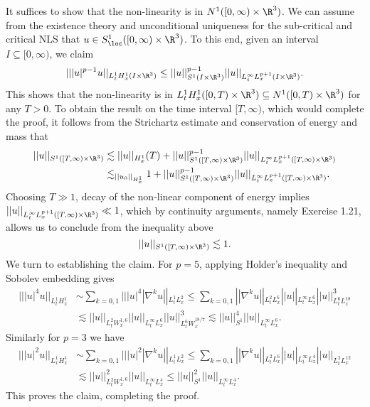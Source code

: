 \begin{solution}
	It suffices to show that the non-linearity is in $N^1 ([0, \infty) \times \R^3)$. We can assume from the existence theory and unconditional uniqueness for the sub-critical and critical NLS that $u \in S^1_{\loc} ([0, \infty) \times \R^3)$. To this end, given an interval $I \subseteq [0, \infty)$, we claim
		\[ || |u|^{p - 1} u||_{L^1_t H^1_x (I \times \R^3)} \leq ||u||_{S^1 (I \times \R^3)}^{p - 1} ||u||_{L^\infty_t L^{p + 1}_x (I \times \R^3)}. \]
	This shows that the non-linearity is in $L^1_t H^1_x ([0, T) \times \R^3) \subseteq N^1 ([0, T) \times \R^3)$ for any $T > 0$. To obtain the result on the time interval $[T, \infty)$, which would complete the proof, it follows from the Strichartz estimate and conservation of energy and mass that
		\begin{align*}
			 ||u||_{S^1 ([T, \infty) \times \R^3)} 
			 	&\lesssim ||u||_{H^1_x} (T) + ||u||_{S^1 ([T, \infty) \times \R^3)}^{p - 1} ||u||_{L^\infty_t L^{p + 1}_x ([T, \infty) \times \R^3)} \\
			 	&\lesssim_{||u_0||_{H^1_x}} 1 + ||u||_{S^1 ([T, \infty) \times \R^3)}^{p - 1} ||u||_{L^\infty_t L^{p + 1}_x ([T, \infty) \times \R^3)}.
	\end{align*}
	Choosing $T \gg 1$, decay of the non-linear component of energy implies $||u||_{L^\infty_t L^{p + 1}_x ([T, \infty) \times \R^3)} \ll 1$, which by continuity arguments, namely Exercise 1.21, allows us to conclude from the inequality above
		\[ ||u||_{S^1 ([T, \infty) \times \R^3)} \lesssim 1. \]
	We turn to establishing the claim. For $p = 5$, applying Holder's inequality and Sobolev embedding gives
		\begin{align*}
			|| |u|^4 u||_{L^1_t H^1_x} 
				&\sim \sum_{k = 0, 1} || |u|^4 |\nabla^k u||_{L^1_t L^2_x} \leq \sum_{k = 0, 1} || \nabla^k u||_{L^2_t L^6_x} ||u||_{L^\infty_t L^6_x} ||u||_{L^6_t L^{18}_x}^3 \\
				&\lesssim || u||_{L^2_t W^{1, 6}_x} ||u||_{L^\infty_t L^6_x} ||u||_{L^6_t \dot W^{18/7}_x}^3 \lesssim ||u||_{S^1}^4 ||u||_{L^\infty_t L^6_x}.
		\end{align*} 
	Similarly for $p = 3$ we have
		\begin{align*}
			|| |u|^2 u||_{L^1_x H^1_x} 
				&\sim \sum_{k = 0, 1} || |u|^2 |\nabla^k u||_{L^1_t L^2_x} \leq \sum_{k = 0, 1} || \nabla^k u||_{L^2_t L^6_x} ||u||_{L^\infty_t L^4_x} ||u||_{L^2_t L^{12}_x} \\
				&\lesssim ||u||_{L^2_t W^{1, 6}_x}^2 ||u||_{L^\infty_t L^4_x} \leq ||u||_{S^1}^2 ||u||_{L^\infty_t L^4_x}.
		\end{align*}	
	This proves the claim, completing the proof.
\end{solution}

